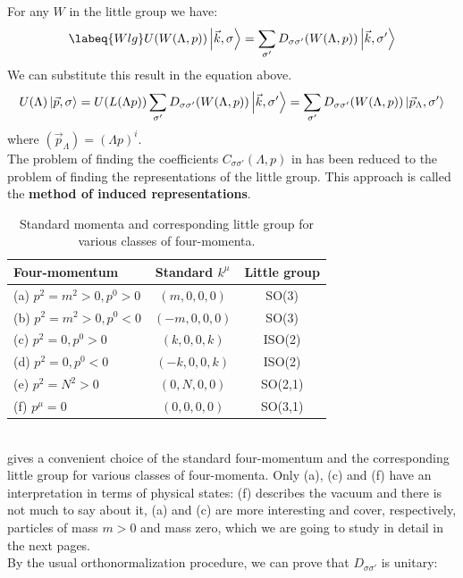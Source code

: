 \documentclass[../main.tex]{subfiles}
\begin{document}
For any $W$ in the little group we have:
\begin{equation}
\labeq{Wlg}
U(W(\Lambda,p))\ket{\vec{k},\sigma}=\sum_{\sigma'}D_{\sigma\sigma'}(W(\Lambda,p))\ket{\vec{k},\sigma'}
\end{equation}
We can substitute this result in the equation above.
\[
U(\Lambda)\ket{\vec{p},\sigma}=U(L(\Lambda p))\sum_{\sigma'}D_{\sigma\sigma'}(W(\Lambda,p))\ket{\vec{k},\sigma'}=\sum_{\sigma'}D_{\sigma\sigma'}(W(\Lambda,p))\ket{\vec{p}_\Lambda,\sigma'}
\]
where $(\vec{p}_\Lambda)=(\Lambda p)^i$.\\
The problem of finding the coefficients $C_{\sigma\sigma'}(\Lambda,p)$ in  has been reduced to the problem of finding the representations of the little group. This approach is called the \textbf{method of induced representations}. 
\begin{table}[h]
    \centering
    \begin{tabular}{lcc}
    \hline
    Four-momentum & Standard $k^\mu$ & Little group \\
    \hline\hline 
    (a) $p^2=m^2>0,p^0>0$ & $(m,0,0,0)$ & SO(3)\\
    (b) $p^2=m^2>0,p^0<0$ & $(-m,0,0,0)$ & SO(3)\\
    (c) $p^2=0,p^0>0$ & $(k,0,0,k)$ & ISO(2)\\
    (d) $p^2=0,p^0<0$ & $(-k,0,0,k)$ & ISO(2)\\
    (e) $p^2=N^2>0$ & $(0,N,0,0)$ & SO(2,1)\\
    (f) $p^\mu=0$ & $(0,0,0,0)$ & SO(3,1)\\
    \hline
    \end{tabular}
    \caption{Standard momenta and corresponding little group for various classes of four-momenta.}
\end{table}\\
 gives a convenient choice of the standard four-momentum and the corresponding little group for various classes of four-momenta. Only (a), (c) and (f) have an interpretation in terms of physical states: (f) describes the vacuum and there is not much to say about it, (a) and (c) are more interesting and cover, respectively, particles of mass $m>0$ and mass zero, which we are going to study in detail in the next pages.\\
By the usual orthonormalization procedure, we can prove that $D_{\sigma\sigma'}$ is unitary:
\end{document}
